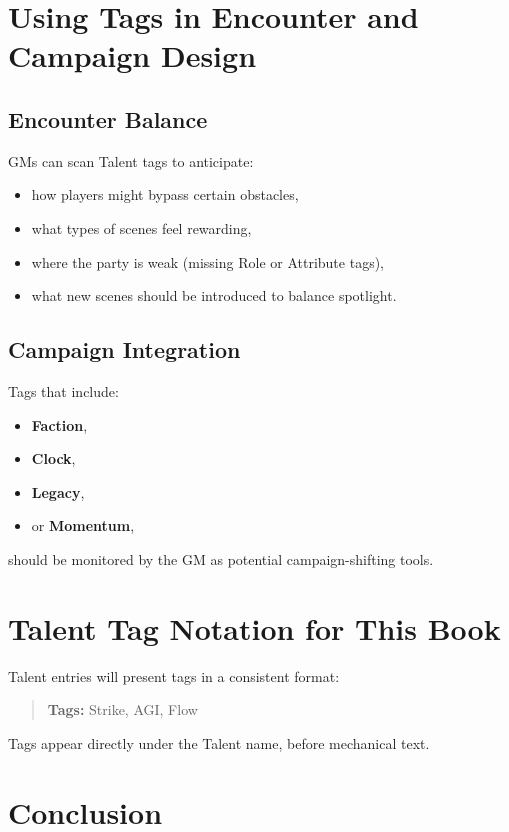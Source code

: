 \documentclass[11pt]{book}
\begin{document}
\section{Using Tags in Encounter and Campaign Design}

\subsection{Encounter Balance}
GMs can scan Talent tags to anticipate:

\begin{itemize}
    \item how players might bypass certain obstacles,
    \item what types of scenes feel rewarding,
    \item where the party is weak (missing Role or Attribute tags),
    \item what new scenes should be introduced to balance spotlight.
\end{itemize}

\subsection{Campaign Integration}
Tags that include:
\begin{itemize}
    \item \textbf{Faction},  
    \item \textbf{Clock},  
    \item \textbf{Legacy},  
    \item or \textbf{Momentum},  
\end{itemize}
should be monitored by the GM as potential campaign-shifting tools.

\section{Talent Tag Notation for This Book}

Talent entries will present tags in a consistent format:

\begin{quote}
\textbf{Tags:} Strike, AGI, Flow
\end{quote}

Tags appear directly under the Talent name, before mechanical text.

\section{Conclusion}
\end{document}
